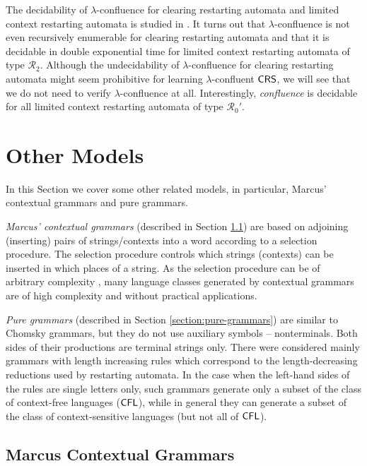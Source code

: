 The decidability of $\lambda$-confluence for clearing restarting automata and limited context restarting automata is studied in \citep{OM15}. It turns out that $\lambda$-confluence is not even recursively enumerable for clearing restarting automata and that it is decidable in double exponential time for limited context restarting automata of type $\mathcal{R}_2$. Although the undecidability of $\lambda$-confluence for clearing restarting automata might seem prohibitive for learning $\lambda$-confluent $\textup{\sf CRS\/}$, we will see that we do not need to verify $\lambda$-confluence at all. Interestingly, \emph{confluence} is decidable for all limited context restarting automata of type $\mathcal{R}_0'$.

\section{Other Models}
\label{section:other-models}

In this Section we cover some other related models, in particular, Marcus' contextual grammars and pure grammars.

\emph{Marcus' contextual grammars} (described in Section \ref{section:marcus-contextual-grammars}) are based on adjoining (inserting) pairs of strings/contexts into a word according to a selection procedure. The selection procedure controls which strings (contexts) can be inserted in which places of a string. As the selection procedure can be of arbitrary complexity \citep{Pa98}, many language classes generated by contextual grammars are of high complexity and without practical applications.

\emph{Pure grammars} \citep{maurer1980pure} (described in Section \ref{section:pure-grammars}) are similar to Chomsky grammars, but they do not use auxiliary symbols -- nonterminals. Both sides of their productions are terminal strings only. There were considered mainly grammars with length increasing rules which correspond to the length-decreasing reductions used by restarting automata. In the case when the left-hand sides of the rules are single letters only, such grammars generate only a subset of the class of context-free languages ($\textup{\sf CFL}$), while in general they can generate a subset of the class of context-sensitive languages (but not all of $\textup{\sf CFL}$).

\subsection{Marcus Contextual Grammars}
\label{section:marcus-contextual-grammars}


